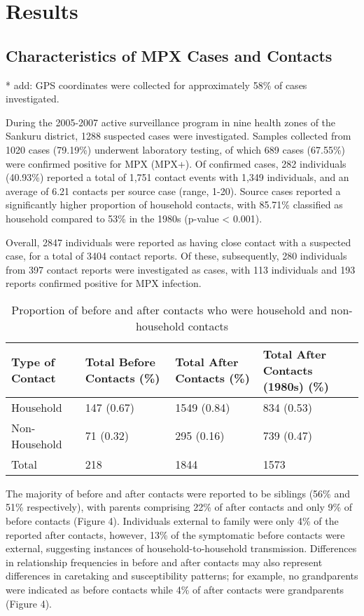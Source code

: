 \section{Results}

\subsection{Characteristics of MPX Cases and Contacts}

* add: GPS coordinates were collected for approximately 58\% of cases investigated. 

During the 2005-2007 active surveillance program in nine health zones of the Sankuru district, 1288 suspected cases were investigated. Samples collected from 1020 cases (79.19\%) underwent laboratory testing, of which 689 cases (67.55\%) were confirmed positive for MPX (MPX+). Of confirmed cases, 282 individuals (40.93\%) reported a total of 1,751 contact events with 1,349 individuals, and an average of 6.21 contacts per source case (range, 1-20). Source cases reported a significantly higher proportion of household contacts, with 85.71\% classified as household compared to 53\% in the 1980s (p-value < 0.001).



Overall, 2847 individuals were reported as having close contact with a suspected case, for a total of 3404 contact reports. Of these, 
subsequently, 280 individuals from 397 contact reports were investigated as cases, with 113 individuals and 193 reports confirmed positive for MPX infection. 

\begin{table}[!h]
\begin{tabular}{lp{5.5cm}p{5.5cm}p{5.5cm}} 
\tabletypesize{\footnotesize}
\toprule
Type of Contact & Total Before Contacts (\%)  &	Total After Contacts (\%) &	 Total After Contacts (1980s) (\%) \\
\midrule
Household & 147 (0.67) & 1549 (0.84) & 834 (0.53) \\
Non-Household &	71 (0.32) &	295	(0.16) & 739 (0.47) \\
\midrule
Total &	218	 &	1844 & 1573  \\
\bottomrule
\end{tabular}
\caption{Proportion of before and after contacts who were household and non-household contacts}
\label{tab:table1}
\end{table}



The majority of before and after contacts were reported to be siblings (56\% and 51\% respectively), with parents comprising 22\% of after contacts and only 9\% of before
contacts (Figure 4). Individuals external to family were only 4\% of the reported after contacts, however, 13\% of the symptomatic before contacts were external, suggesting instances of household-to-household transmission. Differences in relationship frequencies in before and after contacts may also represent differences in caretaking and susceptibility patterns; for example, no grandparents were indicated as before contacts while 4\% of after contacts were grandparents (Figure 4).
